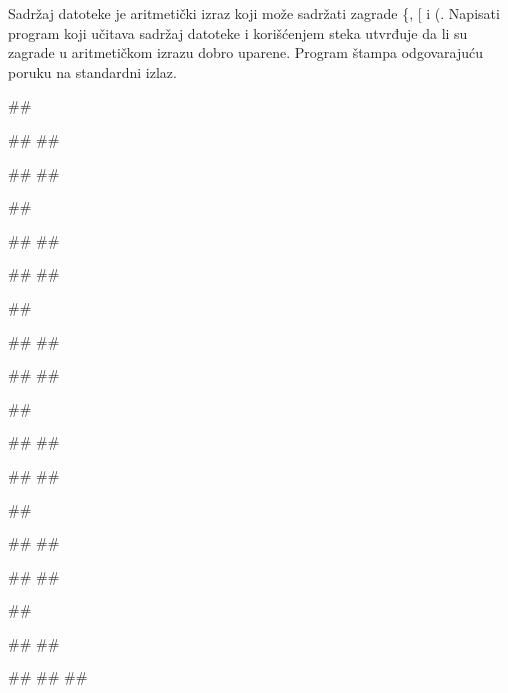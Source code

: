 \begin{Exercise}[label=604]
Sadržaj datoteke je aritmetički izraz koji može sadržati zagrade \{, [ i (. 
Napisati program koji učitava sadržaj datoteke  i korišćenjem steka 
utvrđuje da li su zagrade u aritmetičkom izrazu dobro uparene. Program štampa odgovarajuću poruku na standardni izlaz.

\noindent
\begin{miditest}
\begin{test}{1}
##

##
##
  
#\naslovIzlaz#
##
\end{test}
\end{miditest}
\begin{miditest}
\begin{test}{2}
##

##
##

#\naslovIzlaz#
## 
\end{test}
\end{miditest}
\begin{miditest}
\begin{test}{3}
##

##
#\datoteka{\{[2 + 54) / (24 * 87)\} + (234 + 23)}#

#\naslovIzlaz#
##
\end{test}
\end{miditest}
\begin{miditest}
\begin{test}{4}
##

##
##

#\naslovIzlaz#
##
\end{test}
\end{miditest}
\begin{miditest}
\begin{test}{5}
##

##
##

#\naslovIzlaz#
##
\end{test}
\end{miditest}
\begin{miditest}
\begin{test}{6}
##

##
## 

#\naslovIzlaz#
##
##
\end{test}
\end{miditest}
\end{Exercise}
